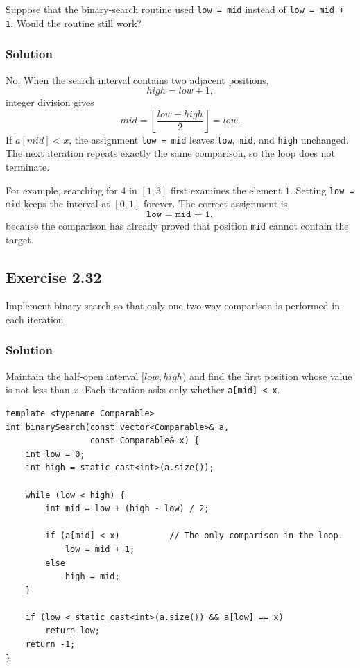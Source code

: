 \documentclass[12pt,a4paper]{article}
\begin{document}
\noindent
Suppose that the binary-search routine used \texttt{low = mid} instead
of \texttt{low = mid + 1}. Would the routine still work?

\subsubsection*{\color{sectionnavy}Solution}

No. When the search interval contains two adjacent positions,
\[
\mathit{high}=\mathit{low}+1,
\]
integer division gives
\[
\mathit{mid}
=\left\lfloor\frac{\mathit{low}+\mathit{high}}2\right\rfloor
=\mathit{low}.
\]
If $a[\mathit{mid}]<x$, the assignment
\texttt{low = mid} leaves \texttt{low}, \texttt{mid}, and
\texttt{high} unchanged. The next iteration repeats exactly the same
comparison, so the loop does not terminate.

For example, searching for $4$ in $[1,3]$ first examines the element
$1$. Setting \texttt{low = mid} keeps the interval at $[0,1]$ forever.
The correct assignment is
\[
\boxed{\texttt{low = mid + 1}},
\]
because the comparison has already proved that position
\texttt{mid} cannot contain the target.

\subsection*{\color{sectionnavy}Exercise 2.32}

\noindent
Implement binary search so that only one two-way comparison is
performed in each iteration.

\subsubsection*{\color{sectionnavy}Solution}

Maintain the half-open interval $[\mathit{low},\mathit{high})$ and find
the first position whose value is not less than $x$. Each iteration asks
only whether \texttt{a[mid] < x}.

\begin{lstlisting}
template <typename Comparable>
int binarySearch(const vector<Comparable>& a,
                 const Comparable& x) {
    int low = 0;
    int high = static_cast<int>(a.size());

    while (low < high) {
        int mid = low + (high - low) / 2;

        if (a[mid] < x)          // The only comparison in the loop.
            low = mid + 1;
        else
            high = mid;
    }

    if (low < static_cast<int>(a.size()) && a[low] == x)
        return low;
    return -1;
}
\end{lstlisting}
\end{document}
